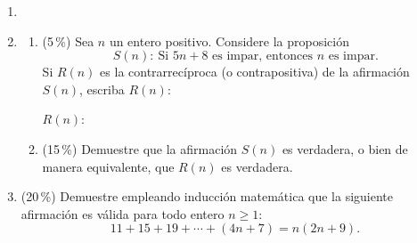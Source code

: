 \documentclass[11pt]{article}
\begin{document}
\begin{enumerate}
\item[]
\item[5.] \begin{enumerate}
  \item (5\,\%) Sea $n$ un entero positivo. Considere la proposición
  \[
  S(n) : \ \text{Si } 5n + 8 \text{ es impar, entonces } n \text{ es impar.}
  \]
  Si $R(n)$ es la contrarrecíproca (o contrapositiva) de la afirmación $S(n)$, escriba $R(n)$:

  \vspace{4pt}
  $R(n)$: \underline{\hspace{10cm}}
  \item (15\,\%) Demuestre que la afirmación $S(n)$ es verdadera, o bien de manera equivalente, que $R(n)$ es verdadera.
  \end{enumerate}

\item[6.] (20\,\%) Demuestre empleando inducción matemática que la siguiente afirmación es válida para todo entero $n \geq 1$:
\[
11 + 15 + 19 + \cdots + (4n + 7) = n(2n + 9).
\]
\end{enumerate}

\vfill
{}
\end{document}
